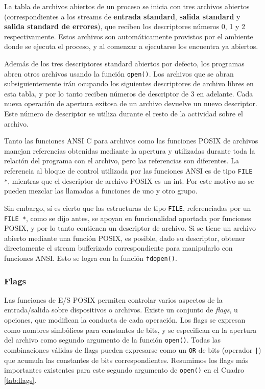 La tabla de archivos abiertos de un proceso se inicia con tres archivos
abiertos (correspondientes a los streams de \textbf{entrada standard}, \textbf{salida standard} y
\textbf{salida standard de errores}), que reciben los descriptores números 0, 1 y 2
respectivamente. Estos archivos son automáticamente provistos por el ambiente donde se ejecuta el 
proceso, y al comenzar a ejecutarse los encuentra ya abiertos.

Además de los tres descriptores standard abiertos por defecto, los programas abren otros archivos 
usando la función \lstinline{open()}. 
Los archivos que se abran subsiguientemente irán ocupando los
siguientes descriptores de archivo libres en esta tabla, y por lo tanto reciben
números de descriptor de 3 en adelante. Cada nueva operación de apertura exitosa de un
archivo devuelve un nuevo descriptor. Este número de descriptor se utiliza
durante el resto de la actividad sobre el archivo.

Tanto las funciones ANSI C para archivos como las funciones POSIX de archivos
manejan referencias obtenidas mediante la apertura y utilizadas durante toda la
relación del programa con el archivo, pero las referencias son diferentes. La
referencia al bloque de control utilizada por las funciones ANSI es de tipo
\lstinline{FILE *}, mientras que el descriptor de archivo POSIX es un int. Por este motivo
no se pueden mezclar las llamadas a funciones de uno y otro grupo.

Sin embargo, sí es cierto que las estructuras de tipo \lstinline{FILE}, referenciadas por
un \lstinline{FILE *}, como se dijo antes, se apoyan en funcionalidad aportada por
funciones POSIX, y por lo tanto contienen un descriptor de archivo. Si se tiene
un archivo abierto mediante una función POSIX, es posible, dado su descriptor,
obtener directamente el stream bufferizado correspondiente para manipularlo con
funciones ANSI. Esto se logra con la función \lstinline{fdopen()}.



\subsubsection{Flags}
Las funciones de E/S POSIX permiten controlar varios aspectos de la entrada/salida sobre dispositivos o archivos. Existe un conjunto de \textit{flags}, u opciones, que modifican la conducta de cada operación.   
Los flags se expresan como nombres simbólicos para constantes de bits, y se especifican en la apertura del archivo como segundo argumento de la función \lstinline{open()}. Todas las combinaciones válidas de flags pueden expresarse como un \lstinline{OR} de bits (operador \lstinline{|}) que acumula las constantes de bits correspondientes. Resumimos los flags más importantes existentes para este segundo argumento de \lstinline{open()} en el Cuadro \ref{tab:flags}.


